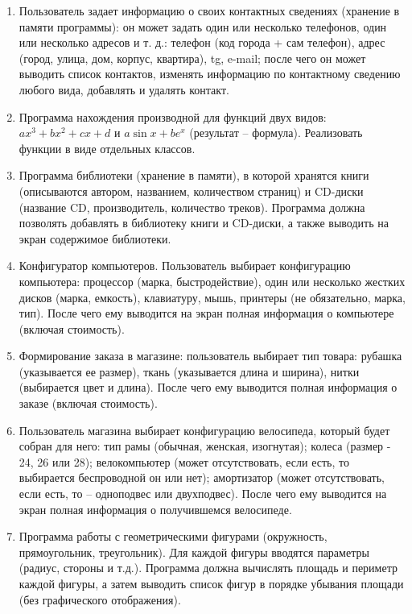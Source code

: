 \documentclass[12pt]{article}
\begin{document}
\begin{enumerate}
\item Пользователь задает информацию о своих контактных сведениях (хранение в памяти программы): он может задать один или несколько
телефонов, один или несколько адресов и т. д.: телефон (код города + сам телефон), адрес (город, улица, дом,
корпус, квартира), tg, e-mail; после чего он может выводить список контактов, изменять информацию
по контактному сведению любого вида, добавлять и удалять контакт.

\item Программа нахождения производной для функций двух видов: $ax^3+bx^2+cx+d$ и $a\sin x+ be^x$ (результат -- формула).
Реализовать функции в виде отдельных классов.

\item Программа библиотеки (хранение в памяти), в которой хранятся книги (описываются автором, названием, количеством страниц) и
CD-диски (название CD, производитель, количество треков). Программа должна позволять добавлять в библиотеку книги и 
CD-диски, а также выводить на экран содержимое библиотеки.

\item Конфигуратор компьютеров. Пользователь выбирает конфигурацию компьютера: процессор (марка, быстродействие), 
один или несколько жестких дисков (марка, емкость), клавиатуру, мышь, принтеры (не обязательно, марка, тип). После
чего ему выводится на экран полная информация о компьютере (включая стоимость).

\item Формирование заказа в магазине: пользователь выбирает тип товара: рубашка (указывается ее размер), 
ткань (указывается длина и ширина), нитки (выбирается цвет и длина). После чего ему выводится полная информация
о заказе (включая стоимость).

\item Пользователь магазина выбирает конфигурацию велосипеда, который будет собран для него: тип рамы 
(обычная, женская, изогнутая); колеса (размер - 24, 26 или 28); велокомпьютер (может отсутствовать, если есть, то
выбирается беспроводной он или нет); амортизатор (может отсутствовать, если есть, то -- одноподвес или двухподвес). 
После чего ему выводится на экран полная информация о получившемся велосипеде.

\item Программа работы с геометрическими фигурами (окружность, прямоугольник, треугольник). Для каждой фигуры вводятся 
параметры (радиус, стороны и т.д.). Программа должна вычислять площадь и периметр каждой фигуры, а затем выводить 
список фигур в порядке убывания площади (без графического отображения).


\end{enumerate}
\end{document}
